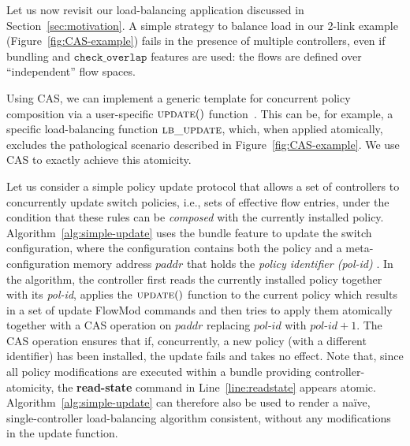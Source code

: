 \documentclass{sig-alternate-2006}
\newcommand{\paddr}{\textit{paddr}\xspace}
\newcommand{\pid}{\textit{pol-id}\xspace}
\newcommand{\checko}{\texttt{check\_overlap}\xspace}
\newcommand{\ufunc}{update} %
\newcommand{\petr}[1]{\textit{\textcolor{blue}{[petr]: #1}}} %
\newcommand{\execatomic}{\textbf{execute-transaction}}
\begin{document}
Let us now revisit our load-balancing application
discussed in Section~\ref{sec:motivation}.
A simple strategy to balance load in our 2-link example
 (Figure~\ref{fig:CAS-example}) fails in the presence of
multiple controllers, even if 
bundling and $\checko$ features are used:
the flows are defined over ``independent'' 
flow spaces. 

Using CAS, we can implement a
generic template 
for concurrent policy composition via a user-specific
$\textsc{\ufunc}()$ function~\cite{infocom15}.
This can be, for example, a specific load-balancing
function $\textsc{lb\_update}$, %
which, when applied atomically, excludes the pathological scenario described in 
Figure~\ref{fig:CAS-example}. 
We use CAS to exactly achieve this atomicity.

Let us consider a simple policy update protocol that
allows a set of  controllers to concurrently update switch policies, i.e., sets of
effective flow entries, under the
condition that these rules can be \emph{composed} with the currently installed
policy.
Algorithm~\ref{alg:simple-update} uses the bundle feature to update
the switch configuration, where the configuration contains both the
policy and a meta-configuration memory address $\paddr$ that holds the \emph{policy identifier (\pid)} .
In the algorithm, the controller first reads the currently installed
policy together with its {\pid},  applies the
$\textsc{\ufunc}()$ function to the current policy which results in a
set of update FlowMod commands and then tries to apply them
atomically together with a CAS operation on $\paddr$ replacing $\pid$
with $\pid+1$.
The CAS operation ensures that if, concurrently, a new policy (with a different identifier) has been installed, the update
fails and takes no effect.
Note that, since all policy modifications are executed within a
bundle providing controller-atomicity, the \textbf{read-state} command
in Line~\ref{line:readstate} appears atomic.  
Algorithm~\ref{alg:simple-update} can therefore also be used
to render a na\"ive, single-controller load-balancing algorithm
consistent, without any modifications in the update function.
\end{document}
